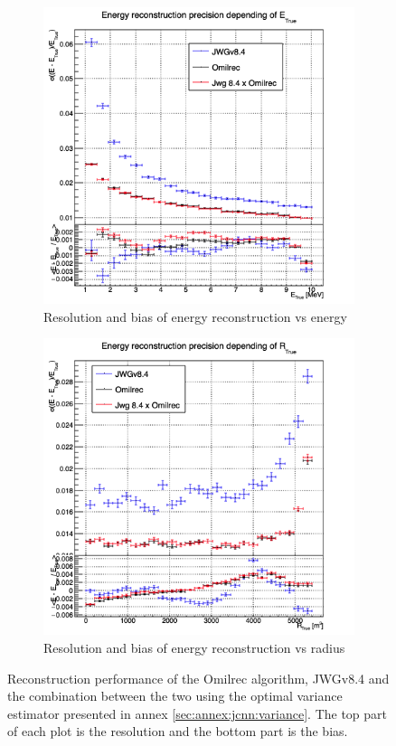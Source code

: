 \documentclass[../main.tex]{subfiles}
\begin{document}
\begin{figure}[ht]
  \centering
  \begin{subfigure}[t]{0.48\linewidth}
    \centering
    \includegraphics[width=\linewidth]{images/jgnn/MSBvTE.png}
    \caption{Resolution and bias of energy reconstruction vs energy}
    \label{fig:jgnn:MESBvETC}
  \end{subfigure}
  \begin{subfigure}[t]{0.48\linewidth}
    \centering
    \includegraphics[width=\linewidth]{images/jgnn/MESBvRT.png}
    \caption{Resolution and bias of energy reconstruction vs radius}
    \label{fig:jgnn:MESBvRTC}
  \end{subfigure}
  \caption{Reconstruction performance of the Omilrec algorithm, JWGv8.4 and the combination between the two using the optimal variance estimator presented in annex \ref{sec:annex:jcnn:variance}. The top part of each plot is the resolution and the bottom part is the bias.}
  \label{fig:jgnn:results_1}
\end{figure}
\end{document}
